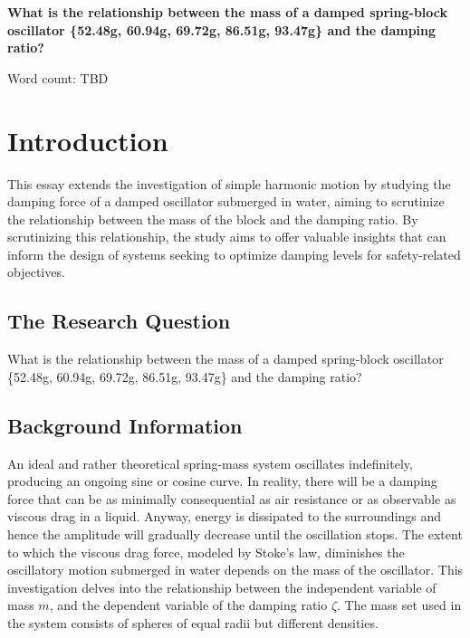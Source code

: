 \documentclass[a4paper,12pt]{article}
\begin{document}
\pagestyle{fancy}


\begin{titlepage}
  \begin{center}
    \vspace*{3cm}

    {\textbf{\Large{What is the relationship between the mass of a damped spring-block oscillator \{52.48g, 60.94g, 69.72g, 86.51g, 93.47g\} and the damping ratio?}}}



    \vspace{4cm}

    Word count: TBD

  \end{center}
\end{titlepage}
\pagebreak
\tableofcontents
\pagebreak

\clearpage
\setcounter{page}{1}

\section{Introduction}
This essay extends the investigation of simple harmonic motion by studying the damping force of a damped oscillator submerged in water, aiming to scrutinize the relationship between the mass of the block and the damping ratio. By scrutinizing this relationship, the study aims to offer valuable insights that can inform the design of systems seeking to optimize damping levels for safety-related objectives.


\subsection{The Research Question}
What is the relationship between the mass of a damped spring-block oscillator \{52.48g, 60.94g, 69.72g, 86.51g, 93.47g\} and the damping ratio?

\subsection{Background Information}
An ideal and rather theoretical spring-mass system oscillates indefinitely, producing an ongoing sine or cosine curve. In reality, there will be a damping force that can be as minimally consequential as air resistance or as observable as viscous drag in a liquid. Anyway, energy is dissipated to the surroundings and hence the amplitude will gradually decrease until the oscillation stops. The extent to which the viscous drag force, modeled by Stoke's law, diminishes the oscillatory motion submerged in water depends on the mass of the oscillator. This investigation delves into the relationship between the independent variable of mass $m$, and the dependent variable of the damping ratio $\zeta$. The mass set used in the system consists of spheres of equal radii but different densities.
\end{document}
